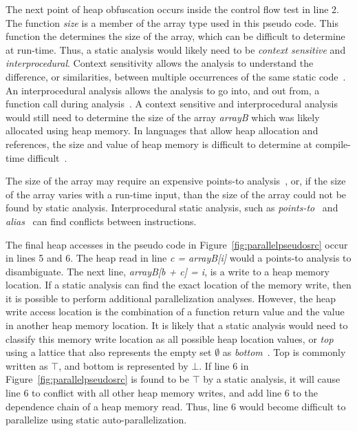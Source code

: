 \documentclass[defaultstyle,11pt]{thesis}
\begin{document}
The next point of heap obfuscation occurs inside the control flow test
in line 2. The function \textit{size} is a member of the array type
used in this pseudo code.  This function the determines the size of
the array, which can be difficult to determine at run-time.  Thus, a
static analysis would likely need to be \textit{context sensitive} and
\textit{interprocedural}.  Context sensitivity allows the analysis to
understand the difference, or similarities, between multiple
occurrences of the same static code~\cite{emami:94:pldi}.  An
interprocedural analysis allows the analysis to go into, and out from,
a function call during analysis~\cite{allen:76:cacm}.  A context
sensitive and interprocedural analysis would still need to determine
the size of the array \textit{arrayB} which was likely allocated using
heap memory.  In languages that allow heap allocation and references,
the size and value of heap memory is difficult to determine at
compile-time difficult~\cite{kong:91:test, muchnick:97:mkp,
  towle:76:uiuccs}.  

The size of the array may require an expensive points-to
analysis~\cite{steensgaard:96:popl}, or, if the size of the array
varies with a run-time input, than the size of the array could not be
found by static analysis. Interprocedural static analysis, such as
\textit{points-to}~\cite{steensgaard:96:popl} and
\textit{alias}~\cite{cooper:89:popl} can find conflicts between
instructions.

The final heap accesses in the pseudo code in
Figure~\ref{fig:parallelpseudosrc} occur in lines 5 and 6.  The heap
read in line \textit{c = arrayB[i]} would a points-to analysis to
disambiguate.  The next line, \textit{arrayB[b + c] = i}, is a write
to a heap memory location.  If a static analysis can find the exact
location of the memory write, then it is possible to perform
additional parallelization analyses.  However, the heap write access
location is the combination of a function return value and the value
in another heap memory location.  It is likely that a static analysis
would need to classify this memory write location as all possible heap
location values, or \textit{top} using a lattice that also represents
the empty set $\emptyset$ as \textit{bottom}~\cite{Tarski:1955kx,
  Davey:2002fj}.  Top is commonly written as $\top$, and bottom is
represented by $\bot$.  If line 6 in
Figure~\ref{fig:parallelpseudosrc} is found to be $\top$ by a static
analysis, it will cause line 6 to conflict with all other heap memory
writes, and add line 6 to the dependence chain of a heap memory read.
Thus, line 6 would become difficult to parallelize using static
auto-parallelization.
\end{document}
